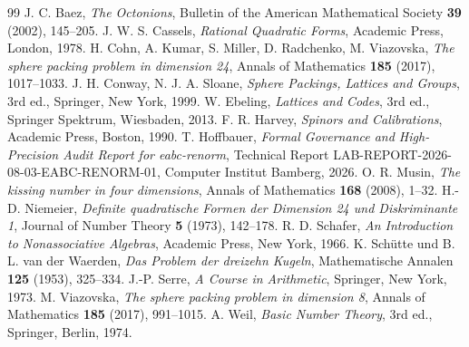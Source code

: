 \documentclass[11pt,a4paper]{article}
\begin{document}
\begin{thebibliography}{99}
 J. C. Baez, \emph{The Octonions}, Bulletin of the American Mathematical Society \textbf{39} (2002), 145--205.
 J. W. S. Cassels, \emph{Rational Quadratic Forms}, Academic Press, London, 1978.
 H. Cohn, A. Kumar, S. Miller, D. Radchenko, M. Viazovska, \emph{The sphere packing problem in dimension 24}, Annals of Mathematics \textbf{185} (2017), 1017--1033.
 J. H. Conway, N. J. A. Sloane, \emph{Sphere Packings, Lattices and Groups}, 3rd ed., Springer, New York, 1999.
 W. Ebeling, \emph{Lattices and Codes}, 3rd ed., Springer Spektrum, Wiesbaden, 2013.
 F. R. Harvey, \emph{Spinors and Calibrations}, Academic Press, Boston, 1990.
 T. Hoffbauer, \emph{Formal Governance and High-Precision Audit Report for eabc-renorm}, Technical Report LAB-REPORT-2026-08-03-EABC-RENORM-01, Computer Institut Bamberg, 2026.
 O. R. Musin, \emph{The kissing number in four dimensions}, Annals of Mathematics \textbf{168} (2008), 1--32.
 H.-D. Niemeier, \emph{Definite quadratische Formen der Dimension 24 und Diskriminante 1}, Journal of Number Theory \textbf{5} (1973), 142--178.
 R. D. Schafer, \emph{An Introduction to Nonassociative Algebras}, Academic Press, New York, 1966.
 K. Schütte und B. L. van der Waerden, \emph{Das Problem der dreizehn Kugeln}, Mathematische Annalen \textbf{125} (1953), 325--334.
 J.-P. Serre, \emph{A Course in Arithmetic}, Springer, New York, 1973.
 M. Viazovska, \emph{The sphere packing problem in dimension 8}, Annals of Mathematics \textbf{185} (2017), 991--1015.
 A. Weil, \emph{Basic Number Theory}, 3rd ed., Springer, Berlin, 1974.
\end{thebibliography}
\end{document}
